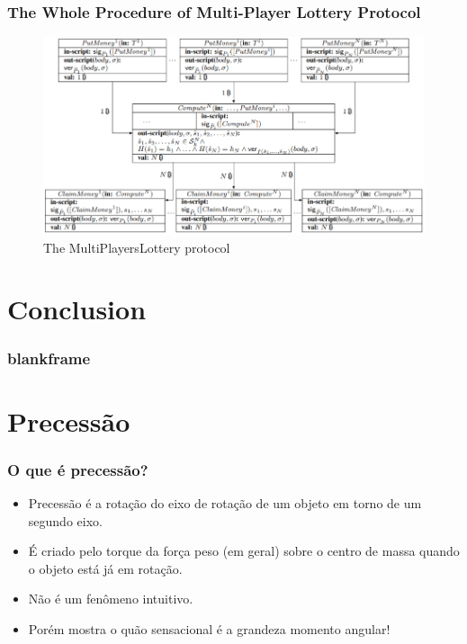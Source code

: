 \documentclass{beamer}
\begin{document}
\begin{frame}\frametitle{The Whole Procedure of Multi-Player Lottery Protocol} 
\begin{figure}
	\includegraphics[width=4.6 in]{myfigs/lotteryprotocol1.jpg}
	\caption{The MultiPlayersLottery protocol}
\end{figure}

\end{frame}


\section[conclu]{Conclusion}

\begin{frame}\frametitle{blankframe} 

\end{frame}






\iffalse


\section{Precessão} 


\begin{frame}
\frametitle{O que é precessão?}
\begin{itemize}
\item Precessão é a rotação do eixo de rotação de um objeto em torno de um segundo eixo.
\item É criado pelo torque da força peso (em geral) sobre o centro de massa quando o objeto está já em rotação. 
\pause
\item Não é um fenômeno intuitivo.
\item Porém mostra o quão sensacional é a grandeza momento angular!
\end{itemize}
\end{frame}
\end{document}
